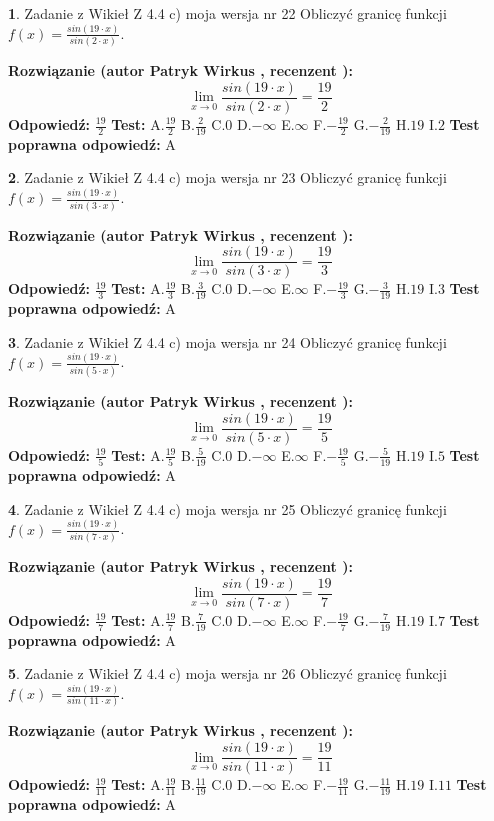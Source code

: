 \documentclass[12pt, a4paper]{article}
\theoremstyle{definition} %
\newtheorem{zad}{}
\newcommand{\zadStart}[1]{\begin{zad}#1\newline}
\newcommand{\zadStop}{\end{zad}}
\newcommand{\rozwStart}[2]{\noindent \textbf{Rozwiązanie (autor #1 , recenzent #2): }\newline}
\newcommand{\rozwStop}{\newline}
\newcommand{\odpStart}{\noindent \textbf{Odpowiedź:}\newline}
\newcommand{\odpStop}{\newline}
\newcommand{\testStart}{\noindent \textbf{Test:}\newline}
\newcommand{\testStop}{\newline}
\newcommand{\kluczStart}{\noindent \textbf{Test poprawna odpowiedź:}\newline}
\newcommand{\kluczStop}{\newline}
\begin{document}
\zadStart{Zadanie z Wikieł Z 4.4 c) moja wersja nr 22}
Obliczyć granicę funkcji $f(x)=\frac{sin(19\cdot x)}{sin(2\cdot x)}$.
\zadStop
\rozwStart{Patryk Wirkus}{}
$$\lim\limits_{x\to 0}\frac{sin(19\cdot x)}{sin(2\cdot x)}=
\frac{19}{2}$$
\rozwStop
\odpStart
$\frac{19}{2}$
\odpStop
\testStart
A.$\frac{19}{2}$
B.$\frac{2}{19}$
C.$0$
D.$-\infty$
E.$\infty$
F.$-\frac{19}{2}$
G.$-\frac{2}{19}$
H.$19$
I.$2$
\testStop
\kluczStart
A
\kluczStop



\zadStart{Zadanie z Wikieł Z 4.4 c) moja wersja nr 23}
Obliczyć granicę funkcji $f(x)=\frac{sin(19\cdot x)}{sin(3\cdot x)}$.
\zadStop
\rozwStart{Patryk Wirkus}{}
$$\lim\limits_{x\to 0}\frac{sin(19\cdot x)}{sin(3\cdot x)}=
\frac{19}{3}$$
\rozwStop
\odpStart
$\frac{19}{3}$
\odpStop
\testStart
A.$\frac{19}{3}$
B.$\frac{3}{19}$
C.$0$
D.$-\infty$
E.$\infty$
F.$-\frac{19}{3}$
G.$-\frac{3}{19}$
H.$19$
I.$3$
\testStop
\kluczStart
A
\kluczStop



\zadStart{Zadanie z Wikieł Z 4.4 c) moja wersja nr 24}
Obliczyć granicę funkcji $f(x)=\frac{sin(19\cdot x)}{sin(5\cdot x)}$.
\zadStop
\rozwStart{Patryk Wirkus}{}
$$\lim\limits_{x\to 0}\frac{sin(19\cdot x)}{sin(5\cdot x)}=
\frac{19}{5}$$
\rozwStop
\odpStart
$\frac{19}{5}$
\odpStop
\testStart
A.$\frac{19}{5}$
B.$\frac{5}{19}$
C.$0$
D.$-\infty$
E.$\infty$
F.$-\frac{19}{5}$
G.$-\frac{5}{19}$
H.$19$
I.$5$
\testStop
\kluczStart
A
\kluczStop



\zadStart{Zadanie z Wikieł Z 4.4 c) moja wersja nr 25}
Obliczyć granicę funkcji $f(x)=\frac{sin(19\cdot x)}{sin(7\cdot x)}$.
\zadStop
\rozwStart{Patryk Wirkus}{}
$$\lim\limits_{x\to 0}\frac{sin(19\cdot x)}{sin(7\cdot x)}=
\frac{19}{7}$$
\rozwStop
\odpStart
$\frac{19}{7}$
\odpStop
\testStart
A.$\frac{19}{7}$
B.$\frac{7}{19}$
C.$0$
D.$-\infty$
E.$\infty$
F.$-\frac{19}{7}$
G.$-\frac{7}{19}$
H.$19$
I.$7$
\testStop
\kluczStart
A
\kluczStop



\zadStart{Zadanie z Wikieł Z 4.4 c) moja wersja nr 26}
Obliczyć granicę funkcji $f(x)=\frac{sin(19\cdot x)}{sin(11\cdot x)}$.
\zadStop
\rozwStart{Patryk Wirkus}{}
$$\lim\limits_{x\to 0}\frac{sin(19\cdot x)}{sin(11\cdot x)}=
\frac{19}{11}$$
\rozwStop
\odpStart
$\frac{19}{11}$
\odpStop
\testStart
A.$\frac{19}{11}$
B.$\frac{11}{19}$
C.$0$
D.$-\infty$
E.$\infty$
F.$-\frac{19}{11}$
G.$-\frac{11}{19}$
H.$19$
I.$11$
\testStop
\kluczStart
A
\kluczStop
\end{document}
